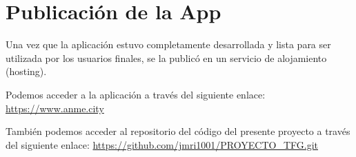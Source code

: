 \section{Publicación de la App}

Una vez que la aplicación estuvo completamente desarrollada y lista para ser utilizada por los usuarios finales, se la publicó en un servicio de alojamiento (hosting).


Podemos acceder a la aplicación a través del siguiente enlace: \url{https://www.anme.city}

También podemos acceder al repositorio del código del presente proyecto a través del siguiente enlace: \url{https://github.com/jmri1001/PROYECTO_TFG.git}






